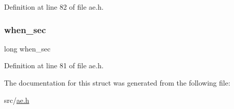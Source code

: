 Definition at line 82 of file ae.\+h.

\mbox{\label{structae_time_event_a512e40dee841595f330e13fdca5f850c}} 
\subsubsection{\texorpdfstring{when\+\_\+sec}{when\_sec}}
{\footnotesize\ttfamily long when\+\_\+sec}



Definition at line 81 of file ae.\+h.



The documentation for this struct was generated from the following file\+:\begin{DoxyCompactItemize}
\item 
src/\hyperlink{ae_8h}{ae.\+h}\end{DoxyCompactItemize}
